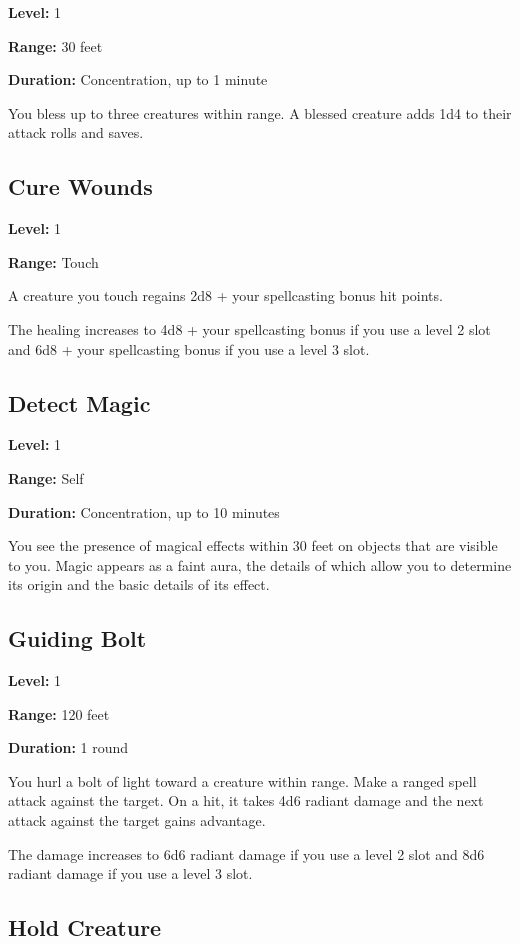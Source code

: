 \documentclass[12pt,letterpaper,twocolumn,openany,nodeprecatedcode,bg=none]{dndbook}
\let\oldsubsection\subsection
\renewcommand{\subsection}[1]{%
  \needspace{5\baselineskip}%
  \oldsubsection{#1}%
}
\begin{document}
\textbf{Level:} 1

\textbf{Range:} 30 feet

\textbf{Duration:} Concentration, up to 1 minute

You bless up to three creatures within range. A blessed creature adds
1d4 to their attack rolls and saves.

\subsection{Cure Wounds}\label{cure-wounds}

\textbf{Level:} 1

\textbf{Range:} Touch

A creature you touch regains 2d8 + your spellcasting bonus hit points.

The healing increases to 4d8 + your spellcasting bonus if you use a
level 2 slot and 6d8 + your spellcasting bonus if you use a level 3
slot.

\subsection{Detect Magic}\label{detect-magic}

\textbf{Level:} 1

\textbf{Range:} Self

\textbf{Duration:} Concentration, up to 10 minutes

You see the presence of magical effects within 30 feet on objects that
are visible to you. Magic appears as a faint aura, the details of which
allow you to determine its origin and the basic details of its effect.

\subsection{Guiding Bolt}\label{guiding-bolt}

\textbf{Level:} 1

\textbf{Range:} 120 feet

\textbf{Duration:} 1 round

You hurl a bolt of light toward a creature within range. Make a ranged
spell attack against the target. On a hit, it takes 4d6 radiant damage
and the next attack against the target gains advantage.

The damage increases to 6d6 radiant damage if you use a level 2 slot and
8d6 radiant damage if you use a level 3 slot.

\subsection{Hold Creature}\label{hold-creature}
\end{document}
